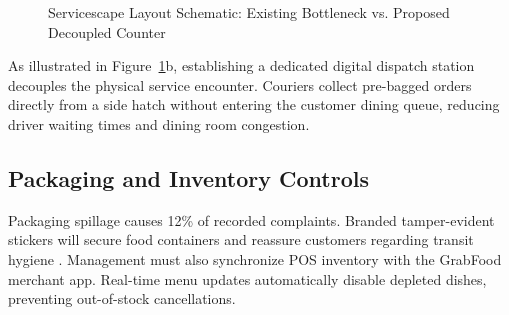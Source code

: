 \documentclass{jomas}
\begin{document}
\begin{figure}[t]
\caption{Servicescape Layout Schematic: Existing Bottleneck vs. Proposed Decoupled Counter}
\label{fig:servicescape-decoupling}
\end{figure}

As illustrated in Figure~\ref{fig:servicescape-decoupling}b, establishing a dedicated digital dispatch station decouples the physical service encounter. Couriers collect pre-bagged orders directly from a side hatch without entering the customer dining queue, reducing driver waiting times and dining room congestion.

\subsection{Packaging and Inventory Controls}
Packaging spillage causes 12\% of recorded complaints. Branded tamper-evident stickers will secure food containers and reassure customers regarding transit hygiene \parencite{kotler2023principlesmarketing}. Management must also synchronize POS inventory with the GrabFood merchant app. Real-time menu updates automatically disable depleted dishes, preventing out-of-stock cancellations.
\end{document}
